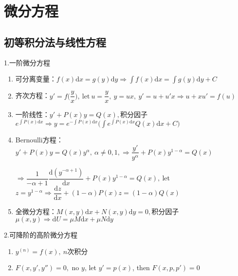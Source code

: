 \documentclass[UTF8]{ctexart}
\numberwithin{equation}{section}
\numberwithin{figure}{section}
\numberwithin{table}{section}
\newcommand\dif{\mathrm{d}}
\newcommand\no{\noindent}
\newcommand\dis{\displaystyle}
\newcommand\intd{\dis\int}
\begin{document}
\begin{spacing}{2}
\begin{enumerate}[itemindent=1.4em, label=(\arabic*)]
\end{enumerate}

\newpage

\section{微分方程}

\subsection{初等积分法与线性方程}

\no1.一阶微分方程

\begin{enumerate}[itemindent=1.4em, label=(\arabic*)]

\item 可分离变量：$f(x)\dif x=g(y)\dif y\Longrightarrow\intd f(x)\dif x=\intd g(y)\dif y+C$

\item 齐次方程：$\dis y'=f\bigg(\dfrac{y}{x}\bigg),\ \text{let}\ u=\dfrac{y}{x},\ y=ux,\ 
y'=u+u'x\Longrightarrow u+xu'=f(u)$

\item 一阶线性：$y'+P(x)y=Q(x),$积分因子$\dis e^{\int P(x)\dif x}\Longrightarrow
\dis y=e^{-\int P(x)\dif x}\bigg(\intd e^{\int P(x)\dif x}Q(x)\dif x+C\bigg)$

\item Bernoulli方程：$y'+P(x)y=Q(x)y^\alpha,\ \alpha\neq0,1,\Longrightarrow
\dfrac{y'}{y^\alpha}+P(x)y^{1-\alpha}=Q(x)$

$\Longrightarrow\dfrac{1}{-\alpha+1}\dfrac{\dif\left(y^{-\alpha+1}\right)}{\dif x}+P(x)y^{1-\alpha}=Q(x),\ $let $z=y^{1-\alpha}
\Longrightarrow\dfrac{\dif z}{\dif x}+(1-\alpha)P(x)z=(1-\alpha)Q(x)$

\item 全微分方程：$M(x,y)\dif x+N(x,y)\dif y=0,$积分因子$\mu(x,y)
\Longrightarrow\dif U=\mu M\dif x+\mu N\dif y$

\end{enumerate}

\no2.可降阶的高阶微分方程

\begin{enumerate}[itemindent=1.4em, label=(\arabic*)]

\item $y^{(n)}=f(x),\ n$次积分

\item $F(x,y',y'')=0,$ no $y$, let $y'=p(x)$, then $F(x,p,p')=0$


\end{enumerate}
\end{spacing}
\end{document}

